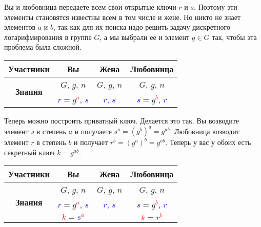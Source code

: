 Вы и любовница передаете всем свои открытые ключи $r$ и $s$. Поэтому эти элементы становятся известны всем в том числе и жене. Но никто не знает элементов $a$ и $b$, так как для их поиска надо решить задачу дискретного логарифмирования в группе $G$, а мы выбрали ее и элемент $g\in G$ так, чтобы эта проблема была сложной.
\begin{center}
\begin{tabular}{|c|c|c|c|}
\hline
{\bf Участники}&{Вы}&{Жена}&{Любовница}\\
\hline
\multirow{2}{*}{\bf Знания}&{\textcolor{OliveGreen}{$G$}, \textcolor{OliveGreen}{$g$}, \textcolor{OliveGreen}{$n$}}&{\textcolor{OliveGreen}{$G$}, \textcolor{OliveGreen}{$g$}, \textcolor{OliveGreen}{$n$}}&{\textcolor{OliveGreen}{$G$}, \textcolor{OliveGreen}{$g$}, \textcolor{OliveGreen}{$n$}}\\
{}&{ \textcolor{blue}{$r$}$=$\textcolor{OliveGreen}{$ g$}\textcolor{red}{${}^a$}, \textcolor{blue}{$s$}}&{\textcolor{blue}{$r$, $s$}}&{ \textcolor{blue}{$s$}$=$\textcolor{OliveGreen}{$g$}\textcolor{red}{${}^b$}, \textcolor{blue}{$r$}}\\
\hline
\end{tabular}
\end{center}

Теперь можно построить приватный ключ. Делается это так. Вы возводите элемент $s$ в степень $a$ и получаете $s^a = (g^b)^a = g^{ab}$. Любовница возводит элемент $r$ в степень $b$ и получает $r^b = (g^a)^b = g^{ab}$. Теперь у вас у обоих есть секретный ключ $k = g^{ab}$.
\begin{center}
\begin{tabular}{|c|c|c|c|}
\hline
{\bf Участники}&{Вы}&{Жена}&{Любовница}\\
\hline
\multirow{3}{*}{\bf Знания}&{\textcolor{OliveGreen}{$G$}, \textcolor{OliveGreen}{$g$}, \textcolor{OliveGreen}{$n$}}&{\textcolor{OliveGreen}{$G$}, \textcolor{OliveGreen}{$g$}, \textcolor{OliveGreen}{$n$}}&{\textcolor{OliveGreen}{$G$}, \textcolor{OliveGreen}{$g$}, \textcolor{OliveGreen}{$n$}}\\
{}&{ \textcolor{blue}{$r$}$=$\textcolor{OliveGreen}{$ g$}\textcolor{red}{${}^a$}, \textcolor{blue}{$s$}}&{\textcolor{blue}{$r$, $s$}}&{ \textcolor{blue}{$s$}$=$\textcolor{OliveGreen}{$g$}\textcolor{red}{${}^b$}, \textcolor{blue}{$r$}}\\
{}&{ \textcolor{red}{$k$}$=$\textcolor{blue}{$s$}\textcolor{red}{${}^a$}}&{}&{ \textcolor{red}{$k$}$=$\textcolor{blue}{$r$}\textcolor{red}{${}^b$}}\\
\hline
\end{tabular}
\end{center}

